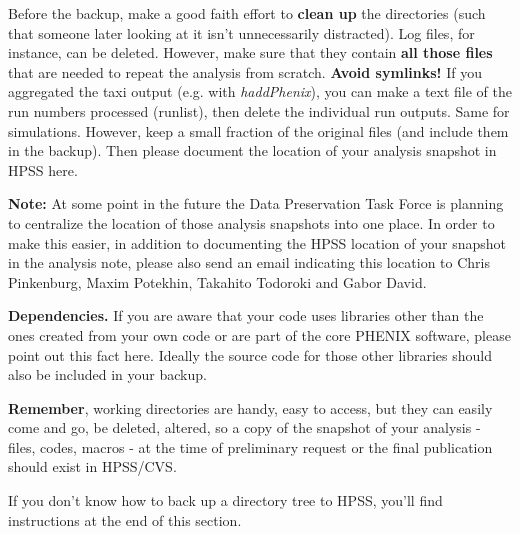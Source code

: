 \documentclass[12pt]{article}
\begin{document}
\begin{description}

Before the backup, make a good faith effort to {\bf clean up} the
directories (such that someone later looking at it isn't unnecessarily
distracted).  Log files, for instance, can be deleted.  
However, make sure that they contain {\bf all those files} that are
needed to repeat the analysis from scratch.  
{\bf Avoid symlinks!}  If you
aggregated the taxi output (e.g. with {\it haddPhenix}), you can 
make a text file of the run numbers processed (runlist), then delete the
individual run outputs.  Same for simulations.  However, keep a small
fraction of the original files (and include them in the backup).
Then please document the location of your analysis snapshot
in HPSS here.  

{\bf Note:} At some point in the future the Data Preservation Task
Force is planning  to centralize the location of those analysis
snapshots into one place.  In order to make this easier, in addition
to documenting the HPSS location of your snapshot in the analysis
note, please also send an email indicating this location to Chris
Pinkenburg, Maxim Potekhin, Takahito Todoroki and Gabor David.

{\bf Dependencies.}
If you are aware that your code uses libraries other than the ones
created from your own code or are part of the core PHENIX software,
please point out this fact here.  Ideally the source code for those
other libraries should also be included in your backup.

{\bf Remember}, working directories are handy, easy to
  access, but they can easily come and go, be deleted, altered, so a
  copy of the snapshot of your analysis - files, codes, macros - at
  the time of preliminary request or the final publication
  should exist in HPSS/CVS.

 If you don't know how to back up a directory tree to HPSS, you'll find
 instructions at  the end of this section.


\end{description}
\end{document}
